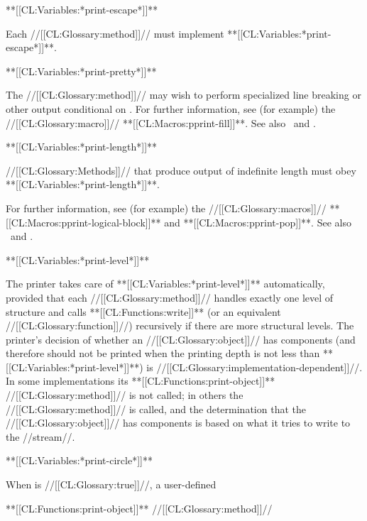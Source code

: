 \item{**[[CL:Variables:*print-escape*]]**}

Each //[[CL:Glossary:method]]// must implement **[[CL:Variables:*print-escape*]]**.

\item{**[[CL:Variables:*print-pretty*]]**}

The //[[CL:Glossary:method]]// may wish to perform specialized line breaking or other output conditional on . For further information, see (for example) the //[[CL:Glossary:macro]]// **[[CL:Macros:pprint-fill]]**. See also \secref\PPrintDispatchTables\ and \secref\PrettyPrinterExamples.


\item{**[[CL:Variables:*print-length*]]**}

//[[CL:Glossary:Methods]]// that produce output of indefinite length must obey **[[CL:Variables:*print-length*]]**.

For further information, see (for example) the //[[CL:Glossary:macros]]// **[[CL:Macros:pprint-logical-block]]** and **[[CL:Macros:pprint-pop]]**. See also \secref\PPrintDispatchTables\ and \secref\PrettyPrinterExamples.


\item{**[[CL:Variables:*print-level*]]**}

The printer takes care of **[[CL:Variables:*print-level*]]** automatically, provided that each //[[CL:Glossary:method]]// handles exactly one level of structure and calls **[[CL:Functions:write]]** (or an equivalent //[[CL:Glossary:function]]//) recursively if there are more structural levels. The printer's decision of whether an //[[CL:Glossary:object]]// has components (and therefore should not be printed when the printing depth is not less than **[[CL:Variables:*print-level*]]**) is //[[CL:Glossary:implementation-dependent]]//. In some implementations its **[[CL:Functions:print-object]]** //[[CL:Glossary:method]]// is not called; in others the //[[CL:Glossary:method]]// is called, and the determination that the //[[CL:Glossary:object]]// has components is based on what it tries to write to the //stream//.

\item{**[[CL:Variables:*print-circle*]]**}

When  is //[[CL:Glossary:true]]//, a user-defined

**[[CL:Functions:print-object]]** //[[CL:Glossary:method]]//

